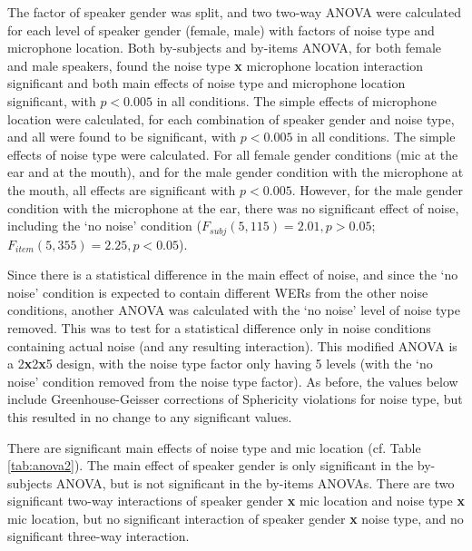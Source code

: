 The factor of speaker gender was split, and two two-way ANOVA were calculated for each level of speaker gender (female, male) with factors of noise type and microphone location.  Both by-subjects and by-items ANOVA, for both female and male speakers, found the noise type \textbf{x} microphone location interaction significant and both main effects of noise type and microphone location significant, with $p<0.005$ in all conditions.  The simple effects of microphone location were calculated, for each combination of speaker gender and noise type, and all were found to be significant, with $p<0.005$ in all conditions.  The simple effects of noise type were calculated.  For all female gender conditions (mic at the ear and at the mouth), and for the male gender condition with the microphone at the mouth, all effects are significant with $p<0.005$.  However, for the male gender condition with the microphone at the ear, there was no significant effect of noise, including the `no noise' condition ($F_{subj}(5,115)=2.01, p>0.05$; $F_{item}(5,355)=2.25, p<0.05$).

Since there is a statistical difference in the main effect of noise, and since the `no noise' condition is expected to contain different WERs from the other noise conditions, another ANOVA was calculated with the `no noise' level of noise type removed.  This was to test for a statistical difference only in noise conditions containing actual noise (and any resulting interaction). This modified ANOVA is a 2\textbf{x}2\textbf{x}5 design, with the noise type factor only having 5 levels (with the `no noise' condition removed from the noise type factor).  As before, the values below include Greenhouse-Geisser corrections of Sphericity violations for noise type, but this resulted in no change to any significant values.

There are significant main effects of noise type and mic location (cf. Table \ref{tab:anova2}).  The main effect of speaker gender is only significant in the by-subjects ANOVA, but is not significant in the by-items ANOVAs.  There are two significant two-way interactions of speaker gender \textbf{x} mic location and noise type \textbf{x} mic location, but no significant interaction of speaker gender \textbf{x} noise type, and no significant three-way interaction.  

